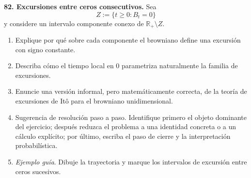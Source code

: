 \documentclass[11pt, letterpaper]{article}
\begin{document}
\newpage
\begin{ejercicio}
    \textbf{82. Excursiones entre ceros consecutivos.} Sea
    \[ Z := \{t \ge 0 : B_t = 0\} \]
    y considere un intervalo componente conexo de $\mathbb{R}_+ \setminus Z$.
    \begin{enumerate}
        \item Explique por qué sobre cada componente el browniano define una excursión con signo constante.
        \item Describa cómo el tiempo local en 0 parametriza naturalmente la familia de excursiones.
        \item Enuncie una versión informal, pero matemáticamente correcta, de la teoría de excursiones de Itô para el browniano unidimensional.
        \item Sugerencia de resolución paso a paso. Identifique primero el objeto dominante del ejercicio; después reduzca el problema a una identidad concreta o a un cálculo explícito; por último, escriba el paso de cierre y la interpretación probabilística.
        \item \textit{Ejemplo guía}. Dibuje la trayectoria y marque los intervalos de excursión entre ceros sucesivos.
    \end{enumerate}
\end{ejercicio}

\vspace{5mm}
\end{document}
